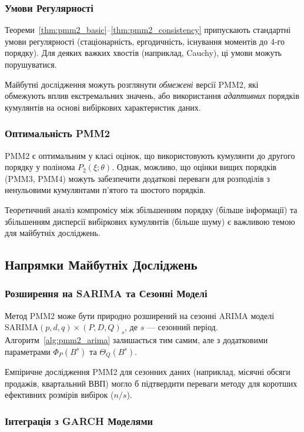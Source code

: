 \documentclass[12pt,a4paper]{article}
\begin{document}
\subsubsection{Умови Регулярності}

Теореми~\ref{thm:pmm2_basic}--\ref{thm:pmm2_consistency} припускають стандартні умови регулярності (стаціонарність, ергодичність, існування моментів до 4-го порядку). Для деяких важких хвостів (наприклад, Cauchy), ці умови можуть порушуватися.

Майбутні дослідження можуть розглянути \textit{обмежені} версії PMM2, які обмежують вплив екстремальних значень, або використання \textit{адаптивних} порядків кумулянтів на основі вибіркових характеристик даних.

\subsubsection{Оптимальність PMM2}

PMM2 є оптимальним у класі оцінок, що використовують кумулянти до другого порядку у полінома $P_2(\xi; \theta)$. Однак, можливо, що оцінки вищих порядків (PMM3, PMM4) можуть забезпечити додаткові переваги для розподілів з ненульовими кумулянтами п'ятого та шостого порядків.

Теоретичний аналіз компромісу між збільшенням порядку (більше інформації) та збільшенням дисперсії вибіркових кумулянтів (більше шуму) є важливою темою для майбутніх досліджень.

\subsection{Напрямки Майбутніх Досліджень}
\label{subsec:future_research}

\subsubsection{Розширення на SARIMA та Сезонні Моделі}

Метод PMM2 може бути природно розширений на сезонні ARIMA моделі SARIMA$(p,d,q) \times (P,D,Q)_s$, де $s$ --- сезонний період. Алгоритм~\ref{alg:pmm2_arima} залишається тим самим, але з додатковими параметрами $\Phi_P(B^s)$ та $\Theta_Q(B^s)$.

Емпіричне дослідження PMM2 для сезонних даних (наприклад, місячні обсяги продажів, квартальний ВВП) могло б підтвердити переваги методу для коротших ефективних розмірів вибірок ($n / s$).

\subsubsection{Інтеграція з GARCH Моделями}
\end{document}
